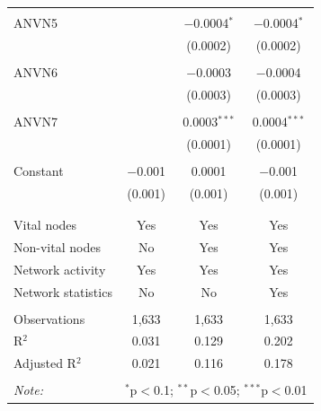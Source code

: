 \begin{table}[!htbp]
\begin{tabular}{@{\extracolsep{5pt}}lccc}
  & & & \\ 
 ANVN5 &  & $-$0.0004$^{*}$ & $-$0.0004$^{*}$ \\ 
  &  & (0.0002) & (0.0002) \\ 
  & & & \\ 
 ANVN6 &  & $-$0.0003 & $-$0.0004 \\ 
  &  & (0.0003) & (0.0003) \\ 
  & & & \\ 
 ANVN7 &  & 0.0003$^{***}$ & 0.0004$^{***}$ \\ 
  &  & (0.0001) & (0.0001) \\ 
  & & & \\ 
 Constant & $-$0.001 & 0.0001 & $-$0.001 \\ 
  & (0.001) & (0.001) & (0.001) \\ 
  & & & \\ 
\hline \\[-1.8ex] 
Vital nodes & Yes & Yes & Yes \\ 
Non-vital nodes & No & Yes & Yes \\ 
Network activity & Yes & Yes & Yes \\ 
Network statistics & No & No & Yes \\ 
\hline &  &  &  \\ 
Observations & 1,633 & 1,633 & 1,633 \\ 
R$^{2}$ & 0.031 & 0.129 & 0.202 \\ 
Adjusted R$^{2}$ & 0.021 & 0.116 & 0.178 \\ 
\hline 
\hline \\[-1.8ex] 
\textit{Note:}  & \multicolumn{3}{r}{$^{*}$p$<$0.1; $^{**}$p$<$0.05; $^{***}$p$<$0.01} \\ 
\end{tabular} 
\end{table} 
